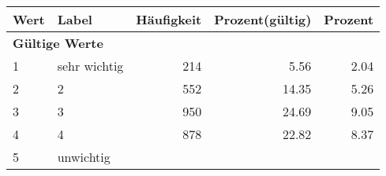      \begin{longtable}{lXrrr}
     \toprule
     \textbf{Wert} & \textbf{Label} & \textbf{Häufigkeit} & \textbf{Prozent(gültig)} & \textbf{Prozent} \\
     \endhead
     \midrule
     \multicolumn{5}{l}{\textbf{Gültige Werte}}\\

     1 &
     \multicolumn{1}{X}{ sehr wichtig   } &


       \num{214} &
       \num[round-mode=places,round-precision=2]{5,56} &
         \num[round-mode=places,round-precision=2]{2,04} \\

     2 &
     \multicolumn{1}{X}{ 2   } &


       \num{552} &
       \num[round-mode=places,round-precision=2]{14,35} &
         \num[round-mode=places,round-precision=2]{5,26} \\

     3 &
     \multicolumn{1}{X}{ 3   } &


       \num{950} &
       \num[round-mode=places,round-precision=2]{24,69} &
         \num[round-mode=places,round-precision=2]{9,05} \\

     4 &
     \multicolumn{1}{X}{ 4   } &


       \num{878} &
       \num[round-mode=places,round-precision=2]{22,82} &
         \num[round-mode=places,round-precision=2]{8,37} \\

     5 &
     \multicolumn{1}{X}{ unwichtig   } &



\end{longtable}
